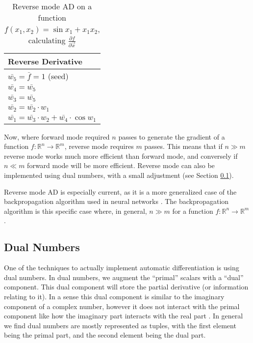 \documentclass{article}
\begin{document}
                \begin{table}
                    \centering
                    \begin{tabular}[hbtp]{|l|}
                        \hline
                        Reverse Derivative \\
                        \hline
                        $\bar{w_5}=\bar{f}=1$ (seed) \\
                        $\bar{w_4}=\bar{w_5}$ \\
                        $\bar{w_3}=\bar{w_5}$ \\
                        $\bar{w_2}=\bar{w_2}\cdot w_1$ \\
                        $\bar{w_1}=\bar{w_3}\cdot w_2+\bar{w_4}\cdot\cos w_1$ \\
                        \hline
                    \end{tabular}
                    \caption{Reverse mode AD on a function $f(x_1,x_2)=\sin x_1+x_1x_2$, calculating $\tfrac{\partial f}{\partial\vec{x}}$}
                    \label{tab:reverse}
                \end{table}

                Now, where forward mode required $n$ passes to generate the gradient of a function $f:\mathbb{R}^n\to\mathbb{R}^m$, reverse mode requires $m$ passes.
                This means that if $n\gg m$ reverse mode works much more efficient than forward mode, and conversely if $n\ll m$ forward mode will be more efficient.
                Reverse mode can also be implemented using dual numbers, with a small adjustment (see Section \ref{ssec:dualnumbers}).

                Reverse mode AD is especially current, as it is a more generalized case of the backpropagation algorithm used in neural networks \cite{baydin2018survey,wang2019demystifying}.
                The backpropagation algorithm is this specific case where, in general, $n\gg m$ for a function $f:\mathbb{R}^n\to\mathbb{R}^m$.
            
        \subsection{Dual Numbers} \label{ssec:dualnumbers}
            One of the techniques to actually implement automatic differentiation is using dual numbers.
            In dual numbers, we augment the ``primal'' scalars with a ``dual'' component.
            This dual component will store the partial derivative (or information relating to it).
            In a sense this dual component is similar to the imaginary component of a complex number, however it does not interact with the primal component like how the imaginary part interacts with the real part \cite{margossian2019review}.
            In general we find dual numbers are mostly represented as tuples, with the first element being the primal part, and the second element being the dual part.
\end{document}
